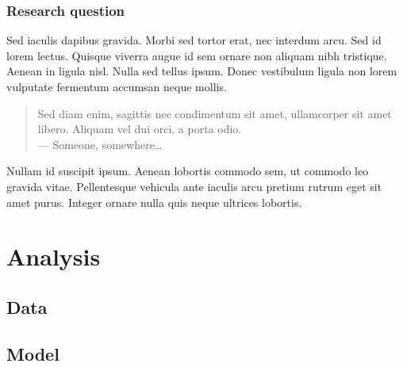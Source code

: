 \documentclass[11pt,]{beamer}
\begin{document}
\begin{frame}
	\frametitle{Research question}
	
	Sed iaculis \alert{dapibus gravida}. Morbi sed tortor erat, nec interdum arcu. Sed id lorem lectus. Quisque viverra augue id sem ornare non aliquam nibh tristique. Aenean in ligula nisl. Nulla sed tellus ipsum. Donec vestibulum ligula non lorem vulputate fermentum accumsan neque mollis.
	
	\bigskip
	
	\begin{quote}
		Sed diam enim, sagittis nec condimentum sit amet, ullamcorper sit amet libero. Aliquam vel dui orci, a porta odio.\\
		--- Someone, somewhere\ldots
	\end{quote}
	
	\bigskip %
	
	Nullam id suscipit ipsum. Aenean lobortis commodo sem, ut commodo leo gravida vitae. Pellentesque vehicula ante iaculis arcu pretium rutrum eget sit amet purus. Integer ornare nulla quis neque ultrices lobortis.
\end{frame}
\section{Analysis}
\subsection{Data}
\subsection{Model}
\end{document}
